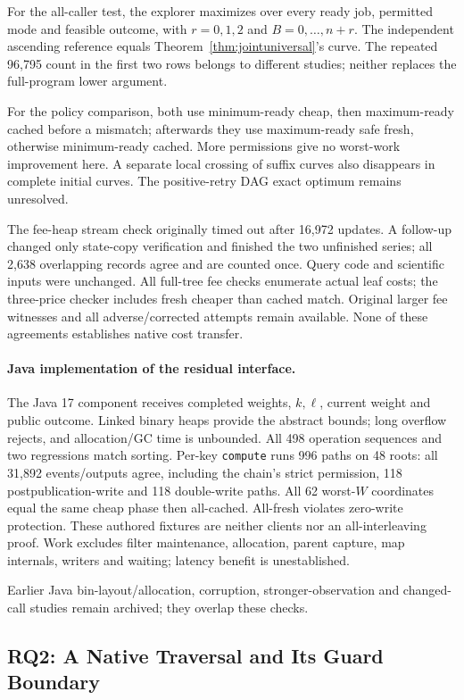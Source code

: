 \documentclass[acmsmall,screen,review,anonymous]{acmart}
\begin{document}
For the all-caller test, the explorer maximizes over every ready job, permitted mode and feasible outcome, with $r=0, 1, 2$ and $B=0,\ldots,n+r$. The independent ascending reference equals Theorem~\ref{thm:jointuniversal}'s curve. The repeated 96,795 count in the first two rows belongs to different studies; neither replaces the full-program lower argument.

For the policy comparison, both use minimum-ready cheap, then maximum-ready cached before a mismatch; afterwards they use maximum-ready safe fresh, otherwise minimum-ready cached. More permissions give no worst-work improvement here. A separate local crossing of suffix curves also disappears in complete initial curves. The positive-retry DAG exact optimum remains unresolved.

The fee-heap stream check originally timed out after 16,972 updates. A follow-up changed only state-copy verification and finished the two unfinished series; all 2,638 overlapping records agree and are counted once. Query code and scientific inputs were unchanged. All full-tree fee checks enumerate actual leaf costs; the three-price checker includes fresh cheaper than cached match. Original larger fee witnesses and all adverse/corrected attempts remain available. None of these agreements establishes native cost transfer.

\paragraph{Java implementation of the residual interface.}
The Java 17 component receives completed weights, $k,\ell$, current weight and public outcome. Linked binary heaps provide the abstract bounds; long overflow rejects, and allocation/GC time is unbounded. All 498 operation sequences and two regressions match sorting. Per-key \texttt{compute} runs 996 paths on 48 roots: all 31,892 events/outputs agree, including the chain's strict permission, 118 postpublication-write and 118 double-write paths. All 62 worst-$W$ coordinates equal the same cheap phase then all-cached. All-fresh violates zero-write protection. These authored fixtures are neither clients nor an all-interleaving proof. Work excludes filter maintenance, allocation, parent capture, map internals, writers and waiting; latency benefit is unestablished.

Earlier Java bin-layout/allocation, corruption, stronger-observation and changed-call studies remain archived; they overlap these checks.

\subsection{RQ2: A Native Traversal and Its Guard Boundary}
\label{sec:linux}
\end{document}
